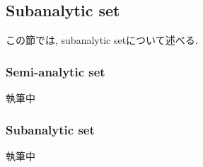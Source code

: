 \documentclass[../main]{subfiles}
\begin{document}
\setcounter{subsection}{1} \addtocounter{subsection}{-1}
\subsection{Subanalytic set}
この節では, subanalytic setについて述べる.
\subsubsection{Semi-analytic set}
執筆中
\subsubsection{Subanalytic set}
執筆中
\end{document}
